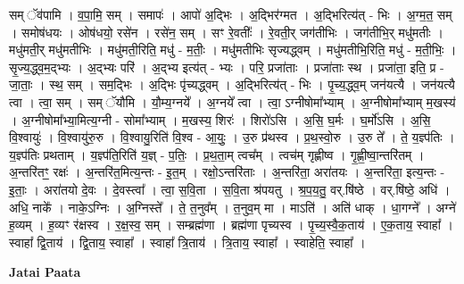 \documentclass[17pt]{extarticle}
\begin{document}
सम् ॅव॑पामि । व॒पा॒मि॒ सम् । समापः॑ । आपो॑ अ॒द्भिः । अ॒द्भिर॑ग्मत । अ॒द्भिरित्य॑त् - भिः । अ॒ग्म॒त॒ सम् । समोष॑धयः । ओष॑धयो॒ रसे॑न । रसे॑न॒ सम् । सꣳ रे॒वतीः᳚ । रे॒वती॒र् जग॑तीभिः । जग॑तीभि॒र् मधु॑मतीः । मधु॑मती॒र् मधु॑मतीभिः । मधु॑मती॒रिति॒ मधु॑ - म॒तीः॒ । मधु॑मतीभिः सृज्यद्ध्वम् । मधु॑मतीभि॒रिति॒ मधु॑ - म॒ती॒भिः॒ । सृ॒ज्य॒द्ध्व॒म॒द्भ्यः । अ॒द्भ्यः परि॑ । अ॒द्भ्य इत्य॑त् - भ्यः । परि॒ प्रजा॑ताः । प्रजा॑ताः स्थ । प्रजा॑ता॒ इति॒ प्र - जा॒ताः॒ । स्थ॒ सम् । सम॒द्भिः । अ॒द्भिः पृ॑च्यद्ध्वम् । अ॒द्भिरित्य॑त् - भिः । पृ॒च्य॒द्ध्व॒म् जन॑यत्यै । जन॑यत्यै त्वा । त्वा॒ सम् । सम् ॅयौ॑मि । यौ॒म्य॒ग्नये᳚ । अ॒ग्नये᳚ त्वा । त्वा॒ ऽग्नीषोमा᳚भ्याम् । अ॒ग्नीषोमा᳚भ्याम् म॒खस्य॑ । अ॒ग्नीषोमा᳚भ्या॒मित्य॒ग्नी - सोमा᳚भ्याम् । म॒खस्य॒ शिरः॑ । शिरो॑ऽसि । अ॒सि॒ घ॒र्मः । घ॒र्मो॑ऽसि । अ॒सि॒ वि॒श्वायुः॑ । वि॒श्वायु॑रु॒रु । वि॒श्वायु॒रिति॑ वि॒श्व - आ॒युः॒ । उ॒रु प्र॑थस्व । प्र॒थ॒स्वो॒रु । उ॒रु ते᳚ । ते॒ य॒ज्ञ्प॑तिः । य॒ज्ञ्प॑तिः प्रथताम् । य॒ज्ञ्प॑ति॒रिति॑ य॒ज्ञ् - प॒तिः॒ । प्र॒थ॒ता॒म् त्वच᳚म् । त्वच॑म् गृह्णीष्व । गृ॒ह्णी॒ष्वा॒न्तरि॑तम् । अ॒न्तरि॑तꣳ॒॒ रक्षः॑ । अ॒न्तरि॑त॒मित्य॒न्तः - इ॒त॒म् । रक्षो॒ऽन्तरि॑ताः । अ॒न्तरि॑ता॒ अरा॑तयः । अ॒न्तरि॑ता॒ इत्य॒न्तः - इ॒ताः॒ । अरा॑तयो दे॒वः । दे॒वस्त्वा᳚ । त्वा॒ स॒वि॒ता । स॒वि॒ता श्र॑पयतु । श्र॒प॒य॒तु॒ वर्.षि॑ष्ठे । वर्.षि॑ष्ठे॒ अधि॑ । अधि॒ नाके᳚ । नाके॒ऽग्निः । अ॒ग्निस्ते᳚ । ते॒ त॒नुव᳚म् । त॒नुव॒म् मा । माऽति॑ । अति॑ धाक् । धा॒गग्ने᳚ । अग्ने॑ ह॒व्यम् । ह॒व्यꣳ र॑क्षस्व । र॒क्ष॒स्व॒ सम् । सम्ब्रह्म॑णा । ब्रह्म॑णा पृच्यस्व । पृ॒च्य॒स्वै॒क॒ताय॑ । ए॒क॒ताय॒ स्वाहा᳚ । स्वाहा᳚ द्वि॒ताय॑ । द्वि॒ताय॒ स्वाहा᳚ । स्वाहा᳚ त्रि॒ताय॑ । त्रि॒ताय॒ स्वाहा᳚ । स्वाहेति॒ स्वाहा᳚ । \newline

\textbf{Jatai Paata} \newline
\end{document}
